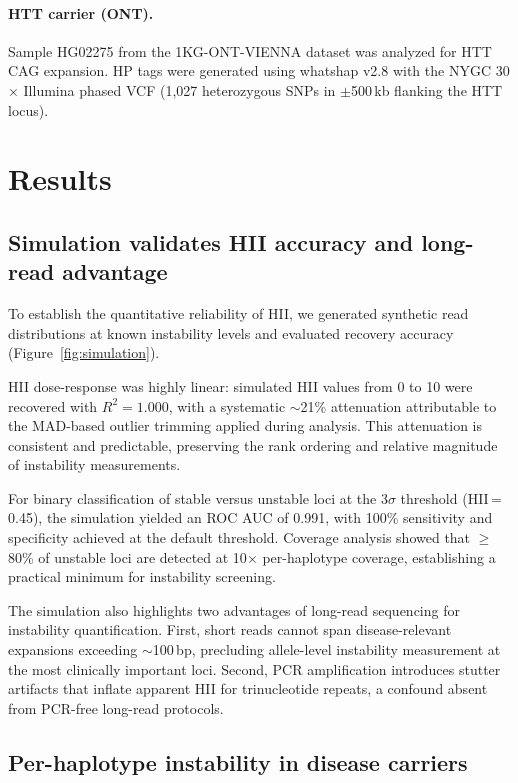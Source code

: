 \documentclass[12pt]{article}
\begin{document}
\paragraph{HTT carrier (ONT).}
Sample HG02275 from the 1KG-ONT-VIENNA dataset was analyzed for HTT CAG expansion.
HP tags were generated using whatshap v2.8 \citep{martin2019} with the NYGC 30$\times$ Illumina phased VCF (1{,}027 heterozygous SNPs in $\pm$500\,kb flanking the HTT locus).

\section{Results}

\subsection{Simulation validates HII accuracy and long-read advantage}

To establish the quantitative reliability of HII, we generated synthetic read distributions at known instability levels and evaluated recovery accuracy (Figure~\ref{fig:simulation}).

HII dose-response was highly linear: simulated HII values from 0 to 10 were recovered with $R^2 = 1.000$, with a systematic $\sim$21\% attenuation attributable to the MAD-based outlier trimming applied during analysis.
This attenuation is consistent and predictable, preserving the rank ordering and relative magnitude of instability measurements.

For binary classification of stable versus unstable loci at the 3$\sigma$ threshold (HII\,=\,0.45), the simulation yielded an ROC AUC of 0.991, with 100\% sensitivity and specificity achieved at the default threshold.
Coverage analysis showed that $\geq$80\% of unstable loci are detected at 10$\times$ per-haplotype coverage, establishing a practical minimum for instability screening.

The simulation also highlights two advantages of long-read sequencing for instability quantification.
First, short reads cannot span disease-relevant expansions exceeding $\sim$100\,bp, precluding allele-level instability measurement at the most clinically important loci.
Second, PCR amplification introduces stutter artifacts that inflate apparent HII for trinucleotide repeats, a confound absent from PCR-free long-read protocols.

\subsection{Per-haplotype instability in disease carriers}
\end{document}

